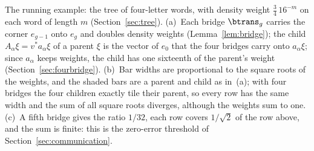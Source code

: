 \caption{The running example: the tree of four-letter words, with density weight $\tfrac34\,16^{-m}$ on each word of length $m$ (Section~\ref{sec:tree}). (a)~Each bridge $\btrans_g$ carries the corner $e_{g-1}$ onto $e_g$ and doubles density weights (Lemma~\ref{lem:bridge}); the child $A_\alpha\xi=v^*a_\alpha\xi$ of a parent $\xi$ is the vector of $e_0$ that the four bridges carry onto $a_\alpha\xi$; since $a_\alpha$ keeps weights, the child has one sixteenth of the parent's weight (Section~\ref{sec:fourbridge}). (b)~Bar widths are proportional to the square roots of the weights, and the shaded bars are a parent and child as in~(a); with four bridges the four children exactly tile their parent, so every row has the same width and the sum of all square roots diverges, although the weights sum to one. (c)~A fifth bridge gives the ratio $1/32$, each row covers $1/\sqrt2$ of the row above, and the sum is finite: this is the zero-error threshold of Section~\ref{sec:communication}.}\label{fig:running}
